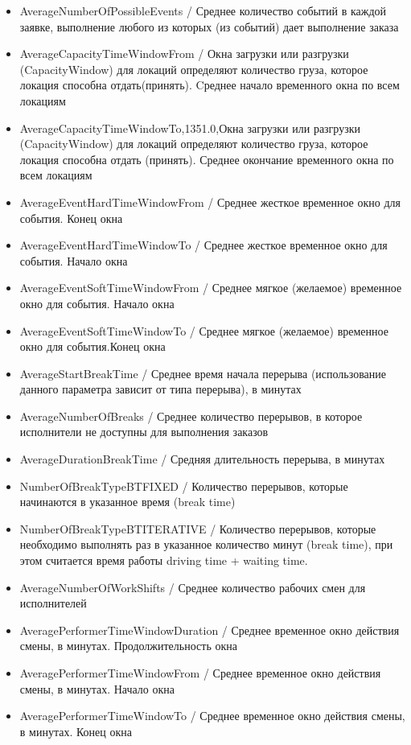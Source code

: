 \documentclass[specification,annotation]{itmo-student-thesis}
\begin{document}
\begin{itemize}
	\item AverageNumberOfPossibleEvents / Среднее количество событий в каждой заявке, выполнение любого из которых (из событий) дает выполнение заказа
	\item AverageCapacityTimeWindowFrom / Окна загрузки или разгрузки (CapacityWindow) для локаций определяют количество груза, которое локация способна отдать(принять). Cреднее начало временного окна по всем локациям
	\item AverageCapacityTimeWindowTo,1351.0,Окна загрузки или разгрузки (CapacityWindow) для локаций определяют количество груза, которое локация способна отдать (принять). Среднее окончание временного окна по всем локациям
	\item AverageEventHardTimeWindowFrom / Среднее жесткое временное окно для события. Конец окна
	\item AverageEventHardTimeWindowTo / Среднее жесткое временное окно для события. Начало окна
	\item AverageEventSoftTimeWindowFrom / Среднее мягкое (желаемое) временное окно для события. Начало окна
	\item AverageEventSoftTimeWindowTo / Среднее мягкое (желаемое) временное окно для события.Конец окна
	\item AverageStartBreakTime / Среднее время начала перерыва (использование данного параметра зависит от типа перерыва), в минутах
	\item AverageNumberOfBreaks / Среднее количество перерывов, в которое исполнители не доступны для выполнения заказов
	\item AverageDurationBreakTime / Средняя длительность перерыва, в минутах
	\item NumberOfBreakTypeBTFIXED / Количество перерывов, которые начинаются в указанное время (break time)
    \item NumberOfBreakTypeBTITERATIVE / Количество перерывов, которые необходимо выполнять раз в указанное количество минут (break time), при этом считается время работы driving time + waiting time.
    \item AverageNumberOfWorkShifts / Среднее количество рабочих смен для исполнителей
    \item AveragePerformerTimeWindowDuration / Среднее временное окно действия смены, в минутах. Продолжительность окна
    \item AveragePerformerTimeWindowFrom / Среднее временное окно действия смены, в минутах. Начало окна
    \item AveragePerformerTimeWindowTo / Среднее временное окно действия смены, в минутах. Конец окна

\end{itemize}
\end{document}
